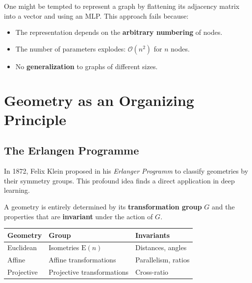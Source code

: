 \begin{warning}[title=\textbf{Why not simply vectorize?}]
One might be tempted to represent a graph by flattening its adjacency matrix
into a vector and using an MLP. This approach fails because:
\begin{itemize}
    \item The representation depends on the \textbf{arbitrary numbering} of nodes.
    \item The number of parameters explodes: $\mathcal{O}(n^2)$ for $n$ nodes.
    \item No \textbf{generalization} to graphs of different sizes.
\end{itemize}
\end{warning}

\section{Geometry as an Organizing Principle}

\subsection{The Erlangen Programme}

In 1872, Felix Klein proposed in his \textit{Erlanger Programm} to classify
geometries by their symmetry groups. This profound idea finds a direct
application in deep learning.

\begin{theorem}
A geometry is entirely determined by its \textbf{transformation group} $G$
and the properties that are \textbf{invariant} under the action of $G$.
\end{theorem}

\begin{example}
\begin{center}
\begin{tabular}{lll}
\toprule
\textbf{Geometry} & \textbf{Group} & \textbf{Invariants} \\
\midrule
Euclidean & Isometries $\mathrm{E}(n)$ & Distances, angles \\
Affine & Affine transformations & Parallelism, ratios \\
Projective & Projective transformations & Cross-ratio \\
\bottomrule
\end{tabular}
\end{center}
\end{example}


